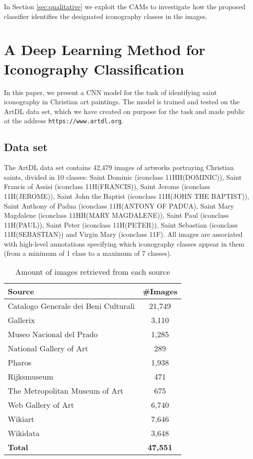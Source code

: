 \documentclass[acmlarge]{acmart}
\begin{document}
In Section \ref{sec:qualitative} we exploit the CAMs to investigate how the proposed classifier identifies the designated iconography classes in the images.  \section{A Deep Learning Method for Iconography Classification}\label{sec:method}

In this paper, we present a CNN model for the task of  identifying   saint iconography in Christian art paintings. The model is  trained and tested on the ArtDL data set, which we have created on purpose for the task and made public at the address \texttt{https://www.artdl.org}.   

\subsection{Data set}\label{sec:meth-dataset}
The ArtDL data set contains 42,479 images of artworks portraying Christian saints, divided in 10 classes: Saint Dominic (iconclass 11HH(DOMINIC)), Saint Francis of Assisi (iconclass 11H(FRANCIS)), Saint Jerome (iconclass 11H(JEROME)), Saint John the Baptist (iconclass 11H(JOHN THE BAPTIST)), Saint Anthony of Padua (iconclass 11H(ANTONY OF PADUA), Saint Mary Magdalene (iconclass 11HH(MARY MAGDALENE)), Saint Paul (iconclass 11H(PAUL)), Saint Peter (iconclass 11H(PETER)), Saint Sebastian (iconclass 11H(SEBASTIAN)) and Virgin Mary (iconclass 11F). All images are associated with high-level annotations specifying which iconography classes appear in them (from a minimum of 1 class to a maximum of 7 classes).

\begin{table}[t]
\centering
\begin{tabular}{ | p{6cm} | c | } 
\hline
\textbf{Source} & \textbf{\#Images}\\ 
\hline
Catalogo Generale dei Beni Culturali\cite{benicult} & 21,749\\ \hline
Gallerix\cite{gallerix} & 3,110\\ \hline
Museo Nacional del Prado\cite{prado} & 1,285\\ \hline
National Gallery of Art\cite{nga} & 289\\ \hline
Pharos\cite{pharos} & 1,938\\ \hline
Rijksmuseum\cite{rijkmus} & 471\\ \hline
The Metropolitan Museum of Art\cite{met} & 675\\ \hline
Web Gallery of Art\cite{wga} & 6,740\\ \hline
Wikiart\cite{wikiart} & 7,646\\ \hline
Wikidata\cite{wikidata} & 3,648\\ \hline
\textbf{Total} & \textbf{47,551}\\ \hline
\end{tabular}
\caption{Amount of images retrieved from each source}
\label{tab:nsources}
\end{table}
\end{document}
